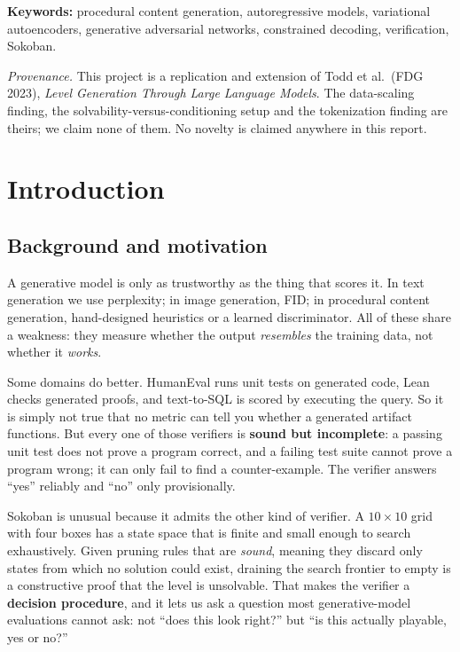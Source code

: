 \documentclass[11pt,a4paper]{report}
\begin{document}
\vspace{6pt}
\textbf{Keywords:} procedural content generation, autoregressive models,
variational autoencoders, generative adversarial networks, constrained
decoding, verification, Sokoban.

\vspace{10pt}
\noindent\textit{Provenance.} This project is a replication and extension of
Todd et al.\ (FDG 2023), \emph{Level Generation Through Large Language Models}.
The data-scaling finding, the solvability-versus-conditioning setup and the
tokenization finding are theirs; we claim none of them. No novelty is claimed
anywhere in this report.

\tableofcontents
\listoffigures
\listoftables

\cleardoublepage
{}
\setcounter{page}{1}

\chapter{Introduction}

\section{Background and motivation}

A generative model is only as trustworthy as the thing that scores it. In text
generation we use perplexity; in image generation, FID; in procedural content
generation, hand-designed heuristics or a learned discriminator. All of these
share a weakness: they measure whether the output \emph{resembles} the training
data, not whether it \emph{works}.

Some domains do better. HumanEval runs unit tests on generated code, Lean checks
generated proofs, and text-to-SQL is scored by executing the query. So it is
simply not true that no metric can tell you whether a generated artifact
functions. But every one of those verifiers is \textbf{sound but incomplete}: a
passing unit test does not prove a program correct, and a failing test suite
cannot prove a program wrong; it can only fail to find a counter-example. The
verifier answers ``yes'' reliably and ``no'' only provisionally.

Sokoban is unusual because it admits the other kind of verifier. A
$10\times10$ grid with four boxes has a state space that is finite and small
enough to search exhaustively. Given pruning rules that are \emph{sound},
meaning they discard only states from which no solution could exist, draining
the search frontier to empty is a constructive proof that the level is
unsolvable. That makes the verifier a \textbf{decision procedure}, and it lets
us ask a question most generative-model evaluations cannot ask: not ``does this
look right?'' but ``is this actually playable, yes or no?''
\end{document}
